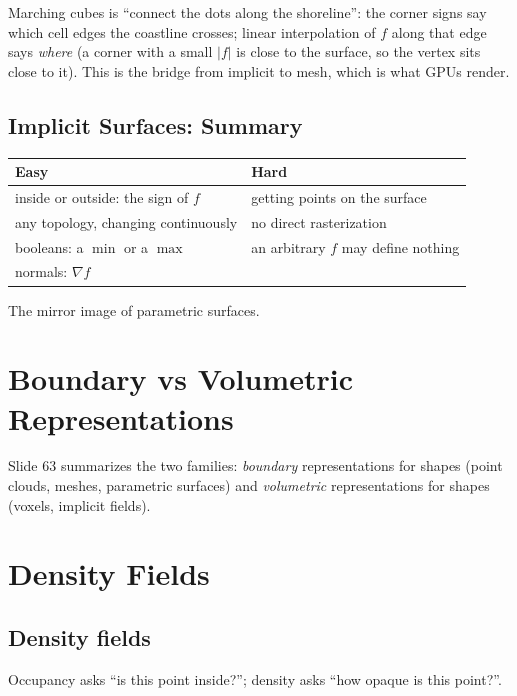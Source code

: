 \documentclass[11pt,a4paper]{article}
\theoremstyle{definition}
\theoremstyle{plain}
\theoremstyle{remark}
\begin{document}
\begin{intuition}
Marching cubes is ``connect the dots along the shoreline'': the corner signs say which cell edges the coastline crosses; linear interpolation of $f$ along that edge says \emph{where} (a corner with a small $|f|$ is close to the surface, so the vertex sits close to it). This is the bridge from implicit to mesh, which is what GPUs render.
\end{intuition}

\subsection{Implicit Surfaces: Summary }
\begin{center}
\begin{tabular}{L{6.6cm}L{6.6cm}}
\toprule
\textbf{Easy} & \textbf{Hard}\\
\midrule
inside or outside: the sign of $f$ & getting points on the surface\\
any topology, changing continuously & no direct rasterization\\
booleans: a $\min$ or a $\max$ & an arbitrary $f$ may define nothing\\
normals: $\nabla f$ & \\
\bottomrule
\end{tabular}
\end{center}
The mirror image of parametric surfaces.

\section{Boundary vs Volumetric Representations }
Slide 63 summarizes the two families: \emph{boundary} representations for shapes (point clouds, meshes, parametric surfaces) and \emph{volumetric} representations for shapes (voxels, implicit fields).

\section{Density Fields }
\subsection{Density fields }
Occupancy asks ``is this point inside?''; density asks ``how opaque is this point?''.
\end{document}
